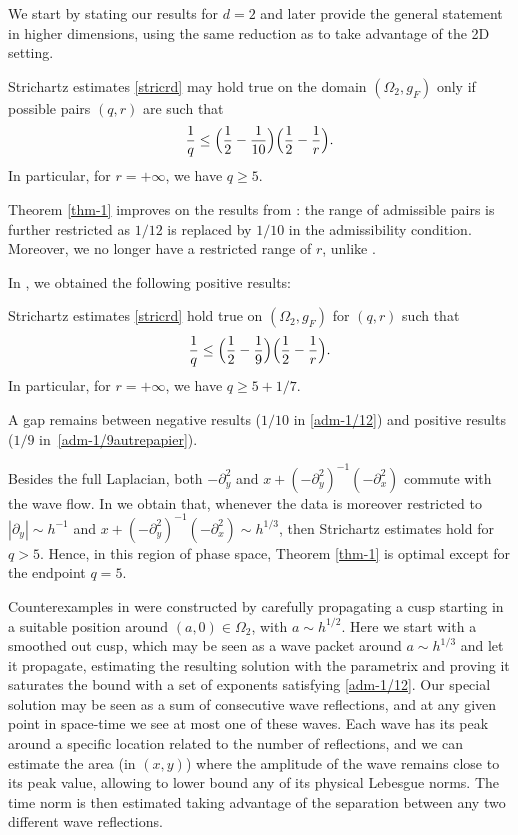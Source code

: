 We start by stating our results for $d=2$ and later provide the general statement in higher dimensions, using the same reduction as \cite{doi2} to take advantage of the 2D setting.
\begin{thm}
\label{thm-1}
Strichartz estimates \eqref{stricrd} may hold true on the domain $(\Omega_{2},g_{F})$ only if possible pairs $(q,r)$ are
such that
\begin{equation}\label{adm-1/12}
\frac 1q\leq \Bigl(\frac{1} 2 -\frac 1 {10}\Bigr)\Bigl(\frac{1}{2}-\frac{1}{r}\Bigr).
\end{equation}
In particular, for $r=+\infty$, we have $q\geq 5$.
\end{thm}
\begin{rmq} Theorem \ref{thm-1} improves on the results from
\cite{doi}: the range of admissible pairs is further restricted as $1/12$ is replaced by $1/10$ in the admissibility condition. Moreover, we no longer have a restricted range of $r$, unlike \cite{doi}.
\end{rmq}
In \cite{ILP3}, we obtained the following positive results:
\begin{thm}
Strichartz estimates \eqref{stricrd} hold true on $(\Omega_{2},g_{F})$ for $(q,r)$ such that
\begin{equation}\label{adm-1/9autrepapier}
\frac 1q\leq \Bigl(\frac{1} 2 -\frac 1 {9}\Bigr)\Bigl(\frac{1}{2}-\frac{1}{r}\Bigr).
\end{equation}
In particular, for $r=+\infty$, we have $q\geq 5+1/7$.
\end{thm}
A gap remains between negative results ($1/10$ in \eqref{adm-1/12}) and positive results ($1/9$ in~\eqref{adm-1/9autrepapier}).
\begin{rmq} Besides the full Laplacian, both $-\partial_{y}^{2}$ and $x+(-\partial^{2}_{y})^{-1}(-\partial_{x}^{2})$ commute with the wave flow. In \cite{ILP3} we obtain that, whenever the data is moreover restricted to $|\partial_{y}|\sim h^{-1}$ and $x+(-\partial^{2}_{y})^{-1}(-\partial_{x}^{2})\sim h^{1/3}$, then Strichartz estimates hold for $q>5$. Hence, in this region of phase space, Theorem \ref{thm-1} is optimal except for the endpoint $q=5$.
\end{rmq}
Counterexamples in \cite{doi} were constructed by carefully
propagating a cusp starting in a suitable position around $(a,0)\in \Omega_{2}$, with $a\sim
h^{1/2}$. Here we start with a smoothed out cusp, which may be seen as a wave packet around $a\sim h^{1/3}$
and let it propagate, estimating the resulting solution with the
parametrix and proving it saturates the bound with a set of exponents satisfying \eqref{adm-1/12}. Our special solution may be seen as a sum of consecutive wave reflections, and at any given point in space-time we see at most one of these waves. Each wave has its peak around a specific location related to the number of reflections, and we can estimate the area (in $(x,y)$) where the amplitude of the wave remains close to its peak value, allowing to lower bound any of its physical Lebesgue norms. The time norm is then estimated taking advantage of the separation between any two different wave reflections.

